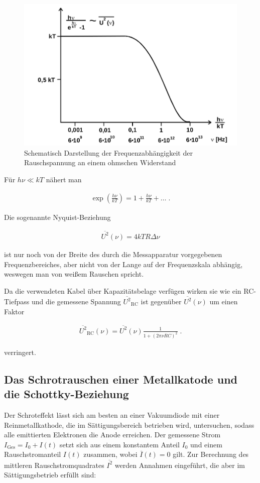 \begin{figure}[htbp]
	\centering
	\includegraphics[width=0.65\linewidth,height=0.5\textheight,keepaspectratio]{bilder/frequenzAbh.png}
	\caption{Schematisch Darstellung der Frequenzabhängigkeit der Rauschspannung an einem ohmschen Widerstand \cite{Anl}}
	\label{FIG:frequenzAbh}
\end{figure}

Für $h\nu \ll kT$ nähert man

\begin{align}
\exp\left( \frac{h\nu}{kT} \right) = 1 + \frac{h\nu}{kT} + \ldots \;.
\end{align}

Die sogenannte Nyquist-Beziehung 

\begin{align}
\overline{U^2}(\nu) = 4kTR\Delta\nu \label{eqn:Nyquist}
\end{align}

ist nur noch von der Breite des durch die Messapparatur vorgegebenen Frequenzbereiches, aber nicht von der Lange auf der Frequenzskala abhängig, weswegen man von weißem Rauschen spricht.

Da die verwendeten Kabel über Kapazitätsbelage verfügen wirken sie wie ein RC-Tiefpass und die gemessene Spannung $\overline{U^2}_{\textrm{RC}}$ ist gegenüber $\overline{U^2}(\nu)$ um einen Faktor

\begin{align}
\overline{U^2}_{\textrm{RC}}(\nu) = \overline{U^2}(\nu) \frac{1}{1 + \left(2\pi\nu{}RC\right)^2} \;. \label{eqn:NyquistRC}
\end{align}

verringert.

\subsection{Das Schrotrauschen einer Metallkatode und die Schottky-Beziehung}
\label{sec:Schrotrauschen}
Der Schroteffekt lässt sich am besten an einer Vakuumdiode mit einer Reinmetallkathode, die im Sättigungsbereich betrieben wird, untersuchen, sodass alle emittierten Elektronen die Anode erreichen. Der gemessene Strom $I_{\textrm{Ges}} = I_0 + I(t)$ setzt sich aus einem konstantem Anteil $I_0$ und einem Rauschstromanteil $I(t)$ zusammen, wobei $\overline{I}(t) = 0$ gilt. Zur Berechnung des mittleren Rauschstromquadrates $\overline{I^2}$ werden Annahmen eingeführt, die aber im Sättigungsbetrieb erfüllt sind:

